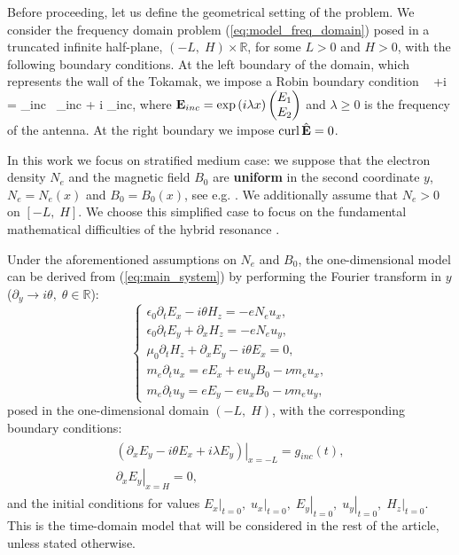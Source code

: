 Before proceeding, let us define the geometrical setting of the problem. 
We consider the frequency domain problem (\ref{eq:model_freq_domain}) posed in a truncated infinite half-plane, $(-L,\;H)\times\mathbb{R}$, for some $L>0$ and $H>0$, with the following
 boundary conditions. At the left boundary of the domain, which represents the wall of the Tokamak, we impose a Robin boundary condition
\be
\label{eq:boundary_conditions_intro}
 {} \
   +i \lambda{}\wedge \n = _{inc} \equiv
   {\operatorname{curl}} \ \E_{inc} + i  \lambda\E_{inc}\wedge \n,
\ee
where ${\bf E}_{inc} = \exp \left(i  \lambda x\right)\begin{pmatrix} E_1\\ E_2 \end{pmatrix}$ and $\lambda\geq 0$ is 
the frequency of the antenna. At the right boundary we impose $\operatorname{curl} \hat{{\bf E}} = 0$. 


In this work we focus on stratified medium case: we suppose that
the electron density $N_{e}$ and the magnetic field $B_0$ are \textbf{uniform} in the second coordinate $y$,
$N_{e}=N_{e}(x)$ and $B_0=B_0(x)$, see e.g. \cite{Despres_2014}. 
We additionally assume that $N_e>0$ on $[-L,\;H]$. We choose this simplified case to focus on the fundamental mathematical difficulties of the hybrid resonance \cite{Despres_2014, singular_solutions}. 

Under the aforementioned assumptions on $N_e$ and $B_0$, the one-dimensional model can be derived from (\ref{eq:main_system}) by performing the Fourier transform in $y$ ($\partial_y\rightarrow i\theta, \; \theta\in\mathbb{R}$):
\begin{equation}
 \label{eq:main_model}
\begin{cases}
\epsilon_0\partial_t E_{x}-i\theta H_z=-eN_e u_x,\\
\epsilon_0\partial_t E_{y}+\partial_x H_z=-eN_e u_y,\\
\mu_0\partial_t H_z+\partial_x E_y-i\theta E_x =0,\\
m_e\partial_t u_x=eE_x+eu_yB_0-\nu m_e u_x,\\
m_e\partial_t u_y=eE_y-eu_xB_0-\nu m_e u_y,
\end{cases}
\end{equation}
 posed in the one-dimensional domain $(-L,\; H)$, with the corresponding boundary conditions:
 \begin{align}
 \label{eq:boundary_conditions_frequency_domain}
 \begin{split}
  \left.\left(\partial_x E_y -i\theta E_x+i\lambda E_y\right)\right|_{x=-L} =g_{inc}(t),\\
  \left.\partial_xE_y\right|_{x=H}=0, 
  \end{split}
 \end{align}
and the initial conditions for values $\left.E_{x}\right|_{t=0},\; \left.u_{x}\right|_{t=0},\; \left.E_{y}\right|_{t=0}, \; \left.u_{y}\right|_{t=0}, \; \left.H_z\right|_{t=0}$. 
This is the time-domain model that will be considered in the rest of the article, unless stated otherwise. 

